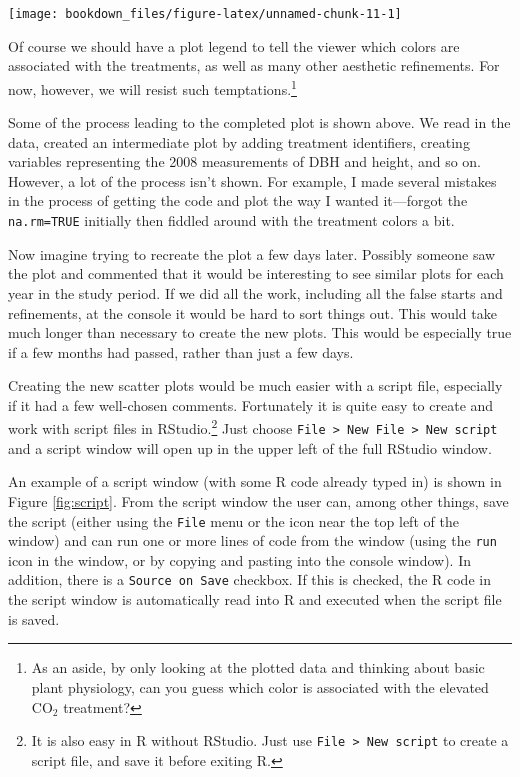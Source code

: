 \documentclass[]{krantz}
\theoremstyle{definition}
\theoremstyle{definition}
\theoremstyle{definition}
\theoremstyle{remark}
\begin{document}
\begin{center}\texttt{[image: bookdown\_files/figure-latex/unnamed-chunk-11-1]} \end{center}

Of course we should have a plot legend to tell the viewer which colors
are associated with the treatments, as well as many other aesthetic
refinements. For now, however, we will resist such
temptations.\footnote{As an aside, by only looking at the plotted data
  and thinking about basic plant physiology, can you guess which color
  is associated with the elevated CO\(_2\) treatment?}

Some of the process leading to the completed plot is shown above. We
read in the data, created an intermediate plot by adding treatment
identifiers, creating variables representing the 2008 measurements of
DBH and height, and so on. However, a lot of the process isn't shown.
For example, I made several mistakes in the process of getting the code
and plot the way I wanted it---forgot the \texttt{na.rm=TRUE} initially
then fiddled around with the treatment colors a bit.

Now imagine trying to recreate the plot a few days later. Possibly
someone saw the plot and commented that it would be interesting to see
similar plots for each year in the study period. If we did all the work,
including all the false starts and refinements, at the console it would
be hard to sort things out. This would take much longer than necessary
to create the new plots. This would be especially true if a few months
had passed, rather than just a few days.

Creating the new scatter plots would be much easier with a script file,
especially if it had a few well-chosen comments. Fortunately it is quite
easy to create and work with script files in RStudio.\footnote{It is
  also easy in R without RStudio. Just use
  \texttt{File\ \textgreater{}\ New\ script} to create a script file,
  and save it before exiting R.} Just choose
\texttt{File\ \textgreater{}\ New\ File\ \textgreater{}\ New\ script}
and a script window will open up in the upper left of the full RStudio
window.

An example of a script window (with some R code already typed in) is
shown in Figure \ref{fig:script}. From the script window the user can,
among other things, save the script (either using the \texttt{File} menu
or the icon near the top left of the window) and can run one or more
lines of code from the window (using the \texttt{run} icon in the
window, or by copying and pasting into the console window). In addition,
there is a \texttt{Source\ on\ Save} checkbox. If this is checked, the R
code in the script window is automatically read into R and executed when
the script file is saved.
\end{document}
